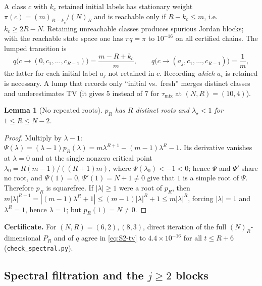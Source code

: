 \documentclass[twoside,11pt]{article}
\newtheorem{slemma}{Lemma}[subsection]
\begin{document}
A class $c$ with $k_c$ retained initial labels has stationary weight
$\pi(c)=(m)_{R-k_c}/(N)_R$ and is reachable only if $R-k_c\le m$, i.e.\
$k_c\ge 2R-N$. Retaining unreachable classes produces spurious Jordan blocks;
with the reachable state space one has $\pi q=\pi$ to $10^{-16}$ on all
certified chains. The lumped transition is
\begin{equation}\label{eq:S2-q}
q\big(c\to(0,c_1,\dots,c_{R-1})\big)=\frac{m-R+k_c}{m},\qquad
q\big(c\to(a_j,c_1,\dots,c_{R-1})\big)=\frac{1}{m},
\end{equation}
the latter for each initial label $a_j$ not retained in $c$. Recording
\emph{which} $a_i$ is retained is necessary. A lump that records only
``initial vs.\ fresh'' merges distinct classes and underestimates TV (it
gives $5$ instead of $7$ for $\tau_{\mathrm{mix}}$ at $(N,R)=(10,4)$).

\begin{slemma}[No repeated roots]\label{lem:squarefree}
$p_R$ has $R$ distinct roots and $\lambda_\star<1$ for $1\le R\le N-2$.
\end{slemma}

\begin{proof}
Multiply by $\lambda-1$:
$\Psi(\lambda)=(\lambda-1)p_R(\lambda)=m\lambda^{R+1}-(m-1)\lambda^{R}-1$.
Its derivative vanishes at $\lambda=0$ and at the single nonzero critical
point $\lambda_0=R(m-1)/((R+1)m)$, where $\Psi(\lambda_0)<-1<0$; hence $\Psi$ and
$\Psi'$ share no root, and $\Psi(1)=0$, $\Psi'(1)=N+1\ne0$ give that $1$ is a simple
root of $\Psi$. Therefore $p_R$ is squarefree. If $|\lambda|\ge1$ were a root of
$p_R$, then
$m|\lambda|^{R+1}=|(m-1)\lambda^{R}+1|\le(m-1)|\lambda|^{R}+1\le m|\lambda|^{R}$,
forcing $|\lambda|=1$ and $\lambda^{R}=1$, hence $\lambda=1$; but
$p_R(1)=N\ne0$.
\end{proof}

\textbf{Certificate.} For $(N,R)=(6,2),(8,3)$, direct iteration of
the full $(N)_R$-dimensional $P_R$ and of $q$ agree in
\eqref{eq:S2-tv} to $4.4\times10^{-16}$ for all $t\le R+6$
(\texttt{check\_spectral.py}).

\subsection{\texorpdfstring{Spectral filtration and the $j\ge2$ blocks}{Spectral filtration and the j at least 2 blocks}}
\label{sec:S3}
\end{document}
